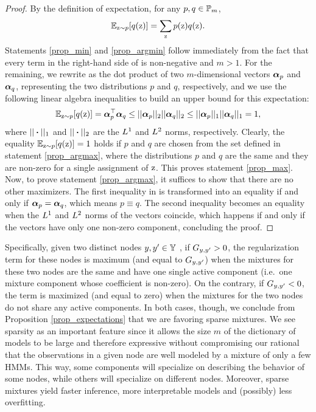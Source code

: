 \begin{proof}
	By the definition of expectation, for any $p, q \in {\mathbb{P}}_m$,
	\begin{equation}
	\label{prop_expdef}
	\mathbb{E}_{{\textnormal{z}}\sim p} [ q({\textnormal{z}}) ] = \sum_{{\textnormal{z}}} p({\textnormal{z}}) q({\textnormal{z}}).
	\end{equation}
	Statements \ref{prop_min} and \ref{prop_argmin} follow immediately from the fact that every term in the right-hand side of  is non-negative and $m>1$. For the remaining, we rewrite  as the dot product of two $m$-dimensional vectors ${\bm{\alpha}}_p$ and ${\bm{\alpha}}_q$, representing the two distributions $p$ and $q$, respectively, and we use the following linear algebra inequalities to build an upper bound for this expectation:
	\begin{equation}
	\label{prop_ineq}
	\mathbb{E}_{{\textnormal{z}}\sim p} [ q({\textnormal{z}}) ] = {\bm{\alpha}}_p ^\top {\bm{\alpha}}_q \leq || {\bm{\alpha}}_p ||_2 || {\bm{\alpha}}_q ||_2 \leq || {\bm{\alpha}}_p ||_1 || {\bm{\alpha}}_q ||_1 =1,
	\end{equation}
	where $||\boldsymbol{\cdot}||_1$ and $||\boldsymbol{\cdot}||_2$ are the $L^1$ and $L^2$ norms, respectively. Clearly, the equality $\mathbb{E}_{{\textnormal{z}}\sim p} [ q({\textnormal{z}}) ] = 1$ holds if $p$ and $q$ are chosen from the set defined in statement \ref{prop_argmax}, where the distributions $p$ and $q$ are the same and they are non-zero for a single assignment of ${\textnormal{z}}$. This proves statement \ref{prop_max}. Now, to prove statement \ref{prop_argmax}, it suffices to show that there are no other maximizers. The first inequality in  is transformed into an equality if and only if ${\bm{\alpha}}_p = {\bm{\alpha}}_q$, which means $p \equiv q$. The second inequality becomes an equality when the $L^1$ and $L^2$ norms of the vectors coincide, which happens if and only if the vectors have only one non-zero component, concluding the proof.
\end{proof}
Specifically, given two distinct nodes $y, y' \in {\mathbb{Y}}$ , if ${G}_{y,y'} > 0$, the regularization term for these nodes is maximum (and equal to ${G}_{y,y'}$) when the mixtures for these two nodes are the same and have one single active component (i.e.\ one mixture component whose coefficient is non-zero). On the contrary, if ${G}_{y,y'} < 0$, the term is maximized (and equal to zero) when the mixtures for the two nodes do not share any active components. In both cases, though, we conclude from Proposition \ref{prop_expectations} that we are favoring sparse mixtures. We see sparsity as an important feature since it allows the size $m$ of the dictionary of models to be large and therefore expressive without compromising our rational that the observations in a given node are well modeled by a mixture of only a few HMMs. This way, some components will specialize on describing the behavior of some nodes, while others will specialize on different nodes. Moreover, sparse mixtures yield faster inference, more interpretable models and (possibly) less overfitting.
